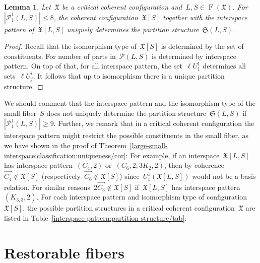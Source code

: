 \documentclass[english,a4paper]{article}
\theoremstyle{plain}
\newtheorem{lemma}      [theorem]{Lemma}
\theoremstyle{definition}
\DeclareMathOperator{\Fibers}{F}
\newcommand{\coherentConfig}{\ensuremath{\mathfrak{X}}}
\newcommand{\fibers}[1]{\ensuremath{\Fibers \left( #1 \right)}}
\newcommand{\interspace}[2]{\ensuremath{\coherentConfig[#1,#2]}}
\newcommand{\inducedCC}[1]{\ensuremath{\coherentConfig[#1]}}
\newcommand{\partition}[1]{\ensuremath{\mathcal{P}^1_1(#1)}}
\newcommand{\equivalenceClasses}[1]{\ensuremath{\mathcal{P}(#1)}}
\newcommand{\partitionStructure}[1]{\ensuremath{\mathfrak{S}(#1)}}
\newcommand{\ipfourCycle}   {\ensuremath{(\cycle{4},2)}}
\newcommand{\ipsixMatchingAndCycle}     {\ensuremath{(\cycle{6},2;\disjointCliques{3}{2},2)}}
\newcommand{\ipsixTriangleComplement}     {\ensuremath{(\clique{3,3},2)}}
\newcommand{\clique}[1]{\ensuremath{K_{#1}}}
\newcommand{\cycle}[1]{\ensuremath{C_{#1}}}
\newcommand{\disjointCliques}[2]{\ensuremath{#1 \clique{#2}}}
\begin{document}
\begin{lemma}
\label{interspace-pattern:partition-structure/lem}
    Let~$\coherentConfig$ be a critical coherent configuration and~$L,S \in \fibers{\coherentConfig}$.
    For~$|\partition{L,S}| \leq 8$, the coherent configuration~$\inducedCC{S}$ together with the interspace pattern of~$\interspace{L}{S}$ uniquely determines the partition structure~$\partitionStructure{L,S}$.
\end{lemma}
\begin{proof}
    Recall that the isomorphism type of~$\inducedCC{S}$ is determined by the set of constituents. For number of
    parts in~$\equivalenceClasses{L,S}$ is determined by interspace pattern.
    On top of that, for all interspace pattern, the set~$\ell U^1_1$ determines all sets~$\ell U^i_j$.
    It follows that up to isomorphism there is a unique partition structure.
\end{proof}


We should comment that the interspace pattern and the isomorphism type of the small fiber~$S$ does not uniquely determine the partition structure~$\partitionStructure{L,S}$ if~$|\partition{L,S}| \geq 9$.
Further, we remark that in a critical coherent configuration the interspace pattern might restrict the possible constituents in the small fiber, as we have shown in the proof of Theorem~\ref{large-small-interspace:classification:uniqueness/cor}:
For example, if an interspace~$\interspace{L}{S}$ has interspace pattern~$\ipfourCycle$ or~$\ipsixMatchingAndCycle$, then by coherence~$\overrightarrow{C_4} \notin \inducedCC{S}$ (respectively~$\overrightarrow{C_6} \notin \inducedCC{S}$) since~$U^1_1(\interspace{L}{S})$ would not be a basis relation.
For similar reasons~$2\overrightarrow{C_3} \notin \inducedCC{S}$ if~$\interspace{L}{S}$ has interspace pattern~$\ipsixTriangleComplement$.
For each interspace pattern and isomorphism type of configuration~$\inducedCC{S}$, the possible partition structures in a critical coherent configuration~$\coherentConfig$ are listed in Table~\ref{interspace-pattern:partition-structure/tab}.
     

\section{Restorable fibers}
\label{critical:restorable/sec}
\end{document}
